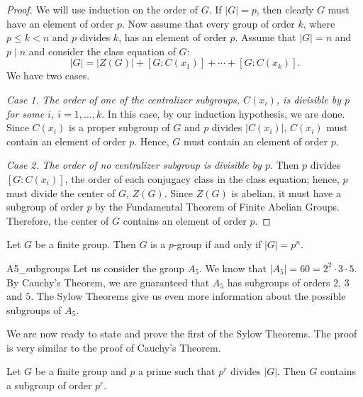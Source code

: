 \begin{proof}
We will use induction on the order of $G$.  If $|G|=p$, then clearly
$G$ must have an element of order $p$. Now assume that every group of
order $k$, where $p \leq k < n$ and $p$ divides $k$, has an element of
order $p$. Assume that $|G|= n$ and $p \mid n$ and consider the class
equation of $G$: 
\[
|G| = |Z(G)| + [G: C(x_1) ] + \cdots + [ G: C(x_k)].
\]
We have two cases.
 
 
\emph{Case 1.}
\emph{The order of one of the centralizer subgroups, $C(x_i)$, is
divisible by $p$ for some $i$, $i = 1, \ldots, k$}. 
In this case,  by our induction hypothesis, we are done. Since $C(x_i)$
is a proper subgroup of $G$ and $p$ divides $|C(x_i)|$, $C(x_i)$ must
contain an element of order $p$. Hence, $G$ must contain an element of
order $p$.  
 
 
\emph{Case 2.}
\emph{The order of no centralizer subgroup is divisible by
$p$}. 
Then $p$ divides $[G:C(x_i)]$, the order of each conjugacy class in
the class equation; hence, $p$ must divide the center of $G$, $Z(G)$.
Since $Z(G)$ is abelian, it must have a subgroup of order $p$ by the
Fundamental Theorem of Finite Abelian Groups. Therefore, the center of
$G$ contains an element of order $p$. 
\end{proof}
 
 
\begin{corollary}
Let $G$ be a finite group. Then $G$ is a $p$-group if and only if $|G|
= p^n$. 
\end{corollary}
 
 
\begin{example}{A5_subgroups}
Let us consider the group $A_5$.  We know that $|A_5| = 60 = 2^2 \cdot
3 \cdot 5$.  By Cauchy's Theorem, we are guaranteed that $A_5$ has
subgroups of orders $2$, $3$ and $5$. The Sylow Theorems give us even
more information about the possible subgroups of $A_5$.
\end{example}
 
 

 
 
We are now ready to state and prove the first of the Sylow Theorems.
The proof is very similar to the proof of Cauchy's Theorem.
 
 
\begin{theorem}
Let $G$ be a finite group and $p$ a prime such that $p^r$ divides
$|G|$. Then $G$ contains a subgroup of order $p^r$. 
\end{theorem}
 

